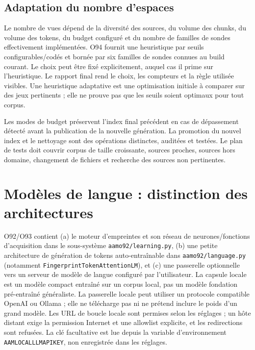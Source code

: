 \documentclass[11pt,a4paper]{article}
\begin{document}
\subsection{Adaptation du nombre d'espaces}
Le nombre de vues dépend de la diversité des sources, du volume des chunks, du volume des tokens, du budget configuré et du nombre de familles de sondes effectivement implémentées. O94 fournit une heuristique par seuils configurables/codés et bornée par six familles de sondes connues au build courant. Le choix peut être fixé explicitement, auquel cas il prime sur l'heuristique. Le rapport final rend le choix, les compteurs et la règle utilisée visibles. Une heuristique adaptative est une optimisation initiale à comparer sur des jeux pertinents ; elle ne prouve pas que les seuils soient optimaux pour tout corpus.

Les modes de budget préservent l'index final précédent en cas de dépassement détecté avant la publication de la nouvelle génération. La promotion du nouvel index et le nettoyage sont des opérations distinctes, auditées et testées. Le plan de tests doit couvrir corpus de taille croissante, sources proches, sources hors domaine, changement de fichiers et recherche des sources non pertinentes.

\section{Modèles de langue : distinction des architectures}
O92/O93 contient (a) le moteur d'empreintes et son réseau de neurones/fonctions d'acquisition dans le sous-système \texttt{aam\textunderscore o92/learning.py}, (b) une petite architecture de génération de tokens auto-entraînable dans \texttt{aam\textunderscore o92/language.py} (notamment \texttt{FingerprintTokenAttentionLM}), et (c) une passerelle optionnelle vers un serveur de modèle de langue configuré par l'utilisateur. La capsule locale est un modèle compact entraîné sur un corpus local, pas un modèle fondation pré-entraîné généraliste. La passerelle locale peut utiliser un protocole compatible OpenAI ou Ollama ; elle ne télécharge pas ni ne prétend inclure le poids d'un grand modèle. Les URL de boucle locale sont permises selon les réglages ; un hôte distant exige la permission Internet et une allowlist explicite, et les redirections sont refusées. La clé facultative est lue depuis la variable d'environnement \texttt{AAM\textunderscore LOCAL\textunderscore LLM\textunderscore API\textunderscore KEY}, non enregistrée dans les réglages.
\end{document}
